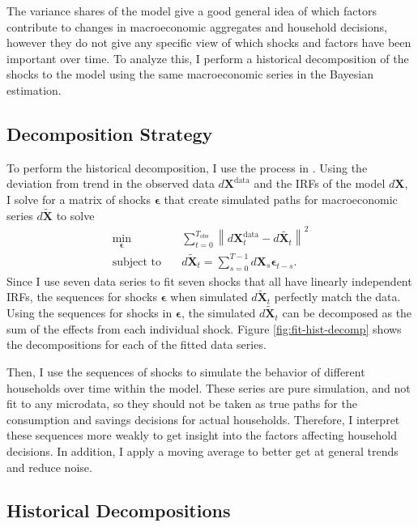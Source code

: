 The variance shares of the model give a good general idea of which factors contribute to changes in macroeconomic aggregates and household decisions, however they do not give any specific view of which shocks and factors have been important over time. To analyze this, I perform a historical decomposition of the shocks to the model using the same macroeconomic series in the Bayesian estimation.


\subsection{Decomposition Strategy}

To perform the historical decomposition, I use the process in \textcite{auclert2023estimating}. Using the deviation from trend in the observed data $d\mathbf{X}^\text{data}$ and the IRFs of the model $d \mathbf{X}$, I solve for a matrix of shocks $\boldsymbol{\epsilon}$ that create simulated paths for macroeconomic series $d \tilde{\mathbf{X}}$ to solve
\begin{align*}
    \min_{\boldsymbol{\epsilon}} \quad & \sum_{t = 0}^{T_\text{obs}} \left\| d\mathbf{X}_t^\text{data} - d \tilde{\mathbf{X}_t} \right\|^2 \\
    \text{subject to} \quad & d \tilde{\mathbf{X}}_t = \sum_{s = 0}^{T-1} d\mathbf{X}_s \boldsymbol{\epsilon}_{t-s}.
\end{align*}
Since I use seven data series to fit seven shocks that all have linearly independent IRFs, the sequences for shocks $\boldsymbol{\epsilon}$ when simulated $d \tilde{\mathbf{X}}_t$ perfectly match the data. Using the sequences for shocks in $\boldsymbol{\epsilon}$, the simulated $d \tilde{\mathbf{X}}_t$ can be decomposed as the sum of the effects from each individual shock. Figure \ref{fig:fit-hist-decomp} shows the decompositions for each of the fitted data series.

Then, I use the sequences of shocks to simulate the behavior of different households over time within the model. These series are pure simulation, and not fit to any microdata, so they should not be taken as true paths for the consumption and savings decisions for actual households. Therefore, I interpret these sequences more weakly to get insight into the factors affecting household decisions. In addition, I apply a moving average to better get at general trends and reduce noise.


\subsection{Historical Decompositions}

